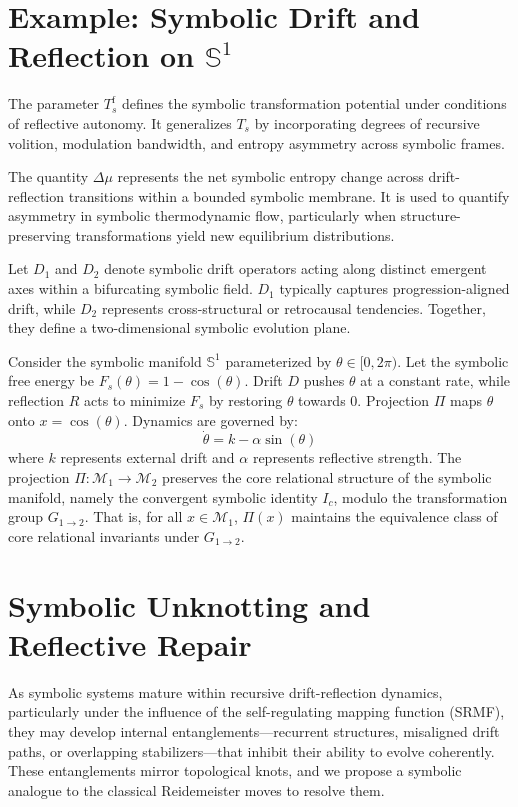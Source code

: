 \section*{Example: Symbolic Drift and Reflection on $\mathbb{S}^1$}
\label{sec:bk8_example}
\begin{definition}
\label{definition:bk8_temperature_freedom}
The parameter \(T_s^{\mathrm{f}}\) defines the symbolic transformation potential under conditions of reflective autonomy. It generalizes \(T_s\) by incorporating degrees of recursive volition, modulation bandwidth, and entropy asymmetry across symbolic frames.
\end{definition}
\begin{definition}
\label{definition:bk8_entropy_shift}
The quantity \(\Delta \mu\) represents the net symbolic entropy change across drift-reflection transitions within a bounded symbolic membrane. It is used to quantify asymmetry in symbolic thermodynamic flow, particularly when structure-preserving transformations yield new equilibrium distributions.
\end{definition}
\begin{definition}
\label{definition:bk8_structural_regulators}
Let \(D_1\) and \(D_2\) denote symbolic drift operators acting along distinct emergent axes within a bifurcating symbolic field. \(D_1\) typically captures progression-aligned drift, while \(D_2\) represents cross-structural or retrocausal tendencies. Together, they define a two-dimensional symbolic evolution plane.
\end{definition}
Consider the symbolic manifold $\mathbb{S}^1$ parameterized by $\theta \in [0, 2\pi)$. Let the symbolic free energy be $F_s(\theta) = 1 - \cos(\theta)$.
Drift $D$ pushes $\theta$ at a constant rate, while reflection $R$ acts to minimize $F_s$ by restoring $\theta$ towards $0$.
Projection $\Pi$ maps $\theta$ onto $x = \cos(\theta)$.
Dynamics are governed by:
\[
\dot{\theta} = k - \alpha \sin(\theta)
\]
where $k$ represents external drift and $\alpha$ represents reflective strength.
\noindent
The projection $\Pi : \mathcal{M}_1 \to \mathcal{M}_2$ preserves the core relational structure of the symbolic manifold, namely the convergent symbolic identity $I_c$, modulo the transformation group $G_{1\to2}$. That is, for all $x \in \mathcal{M}_1$, $\Pi(x)$ maintains the equivalence class of core relational invariants under $G_{1\to2}$.
\section[Symbolic Unknotting]{Symbolic Unknotting and Reflective Repair}
\label{sec:bk8_symbolic_unknotting}
As symbolic systems mature within recursive drift-reflection dynamics, particularly under the influence of the self-regulating mapping function (SRMF), they may develop internal entanglements—recurrent structures, misaligned drift paths, or overlapping stabilizers—that inhibit their ability to evolve coherently. These entanglements mirror topological knots, and we propose a symbolic analogue to the classical Reidemeister moves to resolve them.

